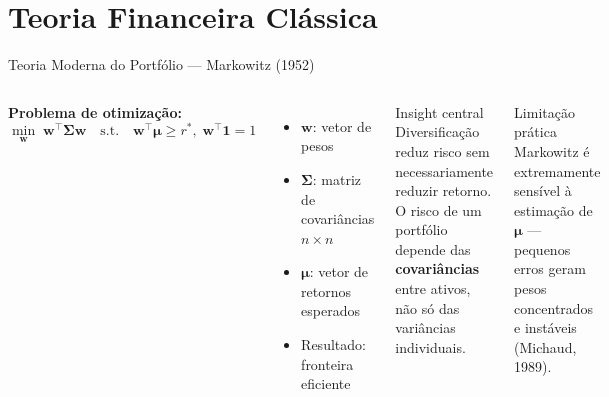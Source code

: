 \documentclass[aspectratio=169,12pt]{beamer}
\begin{document}
\section{Teoria Financeira Clássica}
\begin{frame}[fragile]{Teoria Moderna do Portfólio — Markowitz (1952)}
\begin{columns}[T]
\textbf{Problema de otimização:}
\[
\min_{\mathbf{w}}\;\mathbf{w}^\top\boldsymbol{\Sigma}\mathbf{w}
\quad\text{s.t.}\quad
\mathbf{w}^\top\boldsymbol{\mu}\ge r^*,\;
\mathbf{w}^\top\mathbf{1}=1
\]
\vspace{.3em}
\begin{itemize}
  \item $\mathbf{w}$: vetor de pesos
  \item $\boldsymbol{\Sigma}$: matriz de covariâncias $n\times n$
  \item $\boldsymbol{\mu}$: vetor de retornos esperados
  \item Resultado: \alert{fronteira eficiente}
\end{itemize}
\begin{block}{Insight central}
Diversificação reduz risco sem necessariamente reduzir retorno. O risco de um portfólio depende das \textbf{covariâncias} entre ativos, não só das variâncias individuais.
\end{block}
\vspace{.3em}
\begin{alertblock}{Limitação prática}
Markowitz é extremamente sensível à estimação de $\boldsymbol{\mu}$ — pequenos erros geram pesos concentrados e instáveis (Michaud, 1989).
\end{alertblock}
\end{columns}
\end{frame}
\end{document}

